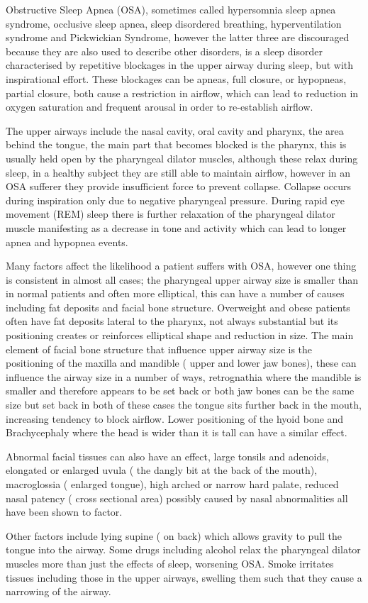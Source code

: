 Obstructive Sleep Apnea (OSA), sometimes called hypersomnia sleep apnea syndrome, occlusive sleep apnea, sleep disordered breathing, hyperventilation syndrome and Pickwickian Syndrome, however the latter three are discouraged because they are also used to describe other disorders, is a sleep disorder characterised by repetitive blockages in the upper airway during sleep, but with inspirational effort. These blockages can be apneas, full closure, or hypopneas, partial closure, both cause a restriction in airflow, which can lead to reduction in oxygen saturation and frequent arousal in order to re-establish airflow. 

The upper airways include the nasal cavity, oral cavity and pharynx, the area behind the tongue, the main part that becomes blocked is the pharynx, this is usually held open by the pharyngeal dilator muscles, although these relax during sleep, in a healthy subject they are still able to maintain airflow, however in an OSA sufferer they provide insufficient force to prevent collapse. Collapse occurs during inspiration only due to negative pharyngeal pressure. During rapid eye movement (REM) sleep there is further relaxation of the pharyngeal dilator muscle manifesting as a decrease in tone and activity which can lead to longer apnea and hypopnea events. 

Many factors affect the likelihood a patient suffers with OSA, however one thing is consistent in almost all cases; the pharyngeal upper airway size is smaller than in normal patients and often more elliptical, this can have a number of causes including fat deposits and facial bone structure. Overweight and obese patients often have fat deposits lateral to the pharynx, not always substantial but its positioning creates or reinforces elliptical shape and reduction in size. The main element of facial bone structure that influence upper airway size is the positioning of the maxilla and mandible ( upper and lower jaw bones), these can influence the airway size in a number of ways, retrognathia where the mandible is smaller and therefore appears to be set back or both jaw bones can be the same size but set back in both of these cases the tongue sits further back in the mouth, increasing tendency to block airflow. Lower positioning of the hyoid bone and Brachycephaly where the head is wider than it is tall can have a similar effect. 

Abnormal facial tissues can also have an effect, large tonsils and adenoids, elongated or enlarged uvula ( the dangly bit at the back of the mouth), macroglossia ( enlarged tongue), high arched or narrow hard palate, reduced nasal patency ( cross sectional area) possibly caused by nasal abnormalities all have been shown to factor.

Other factors include lying supine ( on back) which allows gravity to pull the tongue into the airway. Some drugs including alcohol relax the pharyngeal dilator muscles more than just the effects of sleep, worsening OSA. Smoke irritates tissues including those in the upper airways, swelling them such that they cause a narrowing of the airway. 
